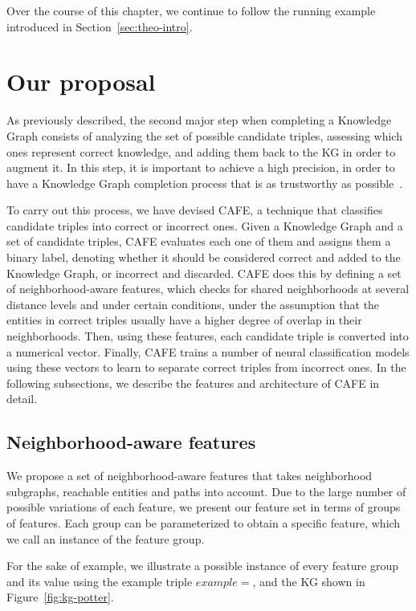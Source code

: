Over the course of this chapter, we continue to follow the running example introduced in Section~\ref{sec:theo-intro}.


\section{Our proposal}\label{sec:cafe-proposal}
As previously described, the second major step when completing a Knowledge Graph consists of analyzing the set of possible candidate triples, assessing which ones represent correct knowledge, and adding them back to the KG in order to augment it. In this step, it is important to achieve a high precision, in order to have a Knowledge Graph completion process that is as trustworthy as possible~\cite{shen2022overview}.

To carry out this process, we have devised CAFE, a technique that classifies candidate triples into correct or incorrect ones. Given a Knowledge Graph and a set of candidate triples, CAFE evaluates each one of them and assigns them a binary label, denoting whether it should be considered correct and added to the Knowledge Graph, or incorrect and discarded. CAFE does this by defining a set of neighborhood-aware features, which checks for shared neighborhoods at several distance levels and under certain conditions, under the assumption that the entities in correct triples usually have a higher degree of overlap in their neighborhoods. Then, using these features, each candidate triple is converted into a numerical vector. Finally, CAFE trains a number of neural classification models using these vectors to learn to separate correct triples from incorrect ones. In the following subsections, we describe the features and architecture of CAFE in detail.

\subsection{Neighborhood-aware features}\label{sec:cafe-features}
We propose a set of neighborhood-aware features that takes neighborhood subgraphs, reachable entities and paths into account. Due to the large number of possible variations of each feature, we present our feature set in terms of groups of features. Each group can be parameterized to obtain a specific feature, which we call an instance of the feature group.

For the sake of example, we illustrate a possible instance of every feature group and its value using the example triple $example = $, and the KG shown in Figure~\ref{fig:kg-potter}.

